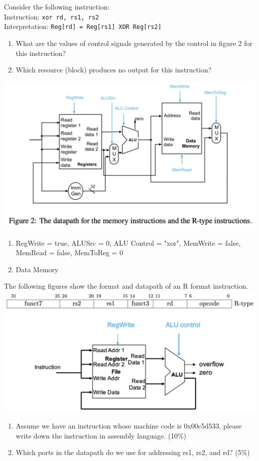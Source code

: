 \documentclass[12pt, a4paper]{article}
\begin{document}
\pagebreak
\begin{q}{10}
Consider the following instruction:\\
Instruction: \texttt{xor rd, rs1, rs2}\\
Interpretation: \texttt{Reg[rd] = Reg[rs1] XOR Reg[rs2]}
\begin{enumerate}
    \item What are the values of control signals generated by the control in figure 2 for this
    instruction?
    \item Which resource (block) produces no output for this instruction?
\end{enumerate}
\begin{center}
    \includegraphics[scale=0.65]{q3.png}
\end{center}
\end{q}
\begin{ans}
    \begin{enumerate}
        \item RegWrite = true, ALUSrc = 0, ALU Control = "xor", MemWrite = false, \\MemRead = false, MemToReg = 0 
        \item Data Memory
    \end{enumerate}
\end{ans}
\pagebreak
\begin{q}{15}
The following figures show the format and datapath of an R format instruction.
\centering\includegraphics[scale=0.65]{q5.png}
\begin{enumerate}
    \item Assume we have an instruction whose machine code is 0x00c5d533, please write
    down the instruction in assembly language. (10\%)
    \item Which ports in the datapath do we use for addressing rs1, rs2, and rd? (5\%)
\end{enumerate}
\end{q}
\end{document}
